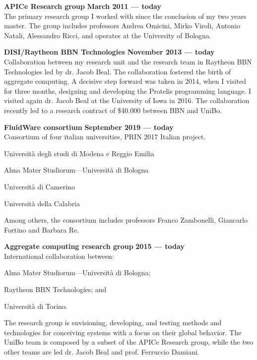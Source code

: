 \textbf{APICe Research group} \hfill \textbf{March 2011 --- today}\\
The primary research group I worked with since the conclusion of my two years master. The group includes professors Andrea Omicini, Mirko Viroli, Antonio Natali, Alessandro Ricci, and operates at the University of Bologna.

\halfblankline{}

\textbf{DISI/Raytheon BBN Technologies} \hfill \textbf{November 2013 --- today}\\
Collaboration between my research unit and the research team in Raytheon BBN Technologies led by dr. Jacob Beal. The collaboration fostered the birth of aggregate computing. A decisive step forward was taken in 2014, when I visited for three months, designing and developing the Protelis programming language. I visited again dr. Jacob Beal at the University of Iowa in 2016. The collaboration recently led to a research contract of \$40.000 between BBN and UniBo.

\halfblankline{}

\textbf{FluidWare consortium} \hfill \textbf{September 2019 --- today}\\
Consortium of four italian universities, PRIN 2017 Italian project.
\begin{innerlist}
    \item Università degli studi di Modena e Reggio Emilia
    \item Alma Mater Studiorum---Università di Bologna
    \item Università di Camerino
    \item Università della Calabria
\end{innerlist}
Among others, the consortium includes professors Franco Zambonelli, Giancarlo Fortino and Barbara Re.

\halfblankline{}

\textbf{Aggregate computing research group} \hfill \textbf{2015 --- today}\\
International collaboration between:
\begin{innerlist}
    \item Alma Mater Studiorum---Università di Bologna;
    \item Raytheon BBN Technologies; and
    \item Università di Torino.
\end{innerlist}
The research group is envisioning, developing, and testing methods and technologies for conceiving systems with a focus on their global behavior. The UniBo team is composed by a subset of the APICe Research group, while the two other teams are led dr. Jacob Beal and prof. Ferruccio Damiani.


